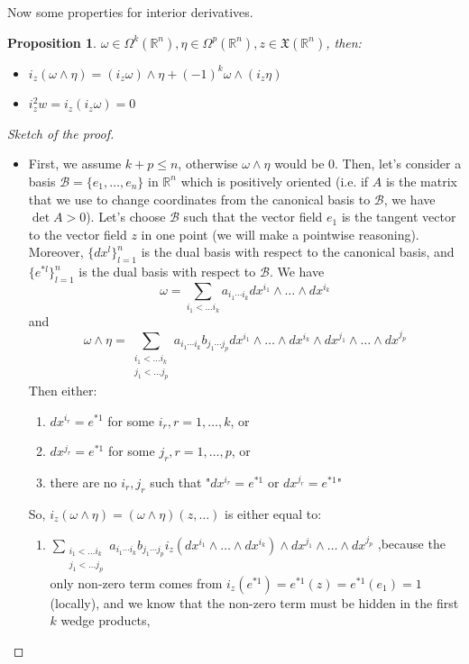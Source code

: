 \documentclass[a4paper,11pt,titlepage, article, oneside]{memoir}
\numberwithin{equation}{section}
\newtheorem{proposition}[theorem]{Proposition}
\theoremstyle{definition}
\theoremstyle{remark}
\newcommand{\rfield}{\mathbb{R}}
\begin{document}
Now some properties for interior derivatives.

\begin{proposition}
  $\omega \in \Omega^k(\rfield^n), \eta \in \Omega^p(\rfield^n), z \in \mathfrak{X}(\rfield^n)$, then:
  \begin{itemize}
    \item $i_z (\omega \wedge \eta) = (i_z \omega) \wedge \eta + (-1)^k \omega \wedge (i_z \eta)$
    \item $i_z^2 w = i_z(i_z \omega) = 0$
  \end{itemize}
\end{proposition}
\begin{proof}[Sketch of the proof]
$ $
\begin{itemize}
\item First, we assume $k+p \le n$, otherwise $\omega \wedge \eta$ would be 0. Then, let's consider a basis $\mathcal{B} = \{e_1, \ldots, e_n\}$ in $\rfield^n$ which is positively oriented (i.e. if $A$ is the matrix that we use to change coordinates from the canonical basis to $\mathcal{B}$, we have $\det A > 0$). Let's choose $\mathcal{B}$ such that the vector field $e_1$ is the tangent vector to the vector field $z$ in one point (we will make a pointwise reasoning). Moreover, $\{dx^l\}_{l=1}^n$ is the dual basis with respect to the canonical basis, and $\{e^{*l}\}_{l=1}^n$ is the dual basis with respect to $\mathcal{B}$. We have 
$$\omega = \sum\limits_{i_1 < \ldots i_k} a_{i_1 \cdots i_k} dx^{i_1} \wedge \ldots \wedge dx^{i_k}$$
and
$$\omega \wedge \eta = \sum\limits_{\substack{i_1 < \ldots i_k \\ j_1 < \ldots j_p }} a_{i_1 \cdots i_k} b_{j_1 \cdots j_p} dx^{i_1} \wedge \ldots \wedge dx^{i_k} \wedge dx^{j_1} \wedge \ldots \wedge dx^{j_p}$$
Then either:
\begin{enumerate}
\item $dx^{i_r} = e^{*1}$ for some $i_r, r= 1, \ldots, k$, or
\item $dx^{j_r} = e^{*1}$ for some $j_r, r= 1, \ldots, p$, or
\item there are no $i_r, j_r$ such that "$dx^{i_r} = e^{*1}$ or $dx^{j_r} = e^{*1}$"
\end{enumerate}
So, $i_z (\omega \wedge \eta) = (\omega \wedge \eta)(z, \ldots)$ is either equal to:
\begin{enumerate}
\item $\sum\limits_{\substack{i_1 < \ldots i_k \\ j_1 < \ldots j_p }} a_{i_1 \cdots i_k} b_{j_1 \cdots j_p} i_z \left( dx^{i_1} \wedge \ldots \wedge dx^{i_k} \right ) \wedge dx^{j_1} \wedge \ldots \wedge dx^{j_p}$ ,because the only non-zero term comes from $i_z(e^{*1}) = e^{*1}(z) = e^{*1}(e_1) = 1$ (locally), and we know that the non-zero term must be hidden in the first $k$ wedge products,

\end{enumerate}
\end{itemize}
\end{proof}
\end{document}
